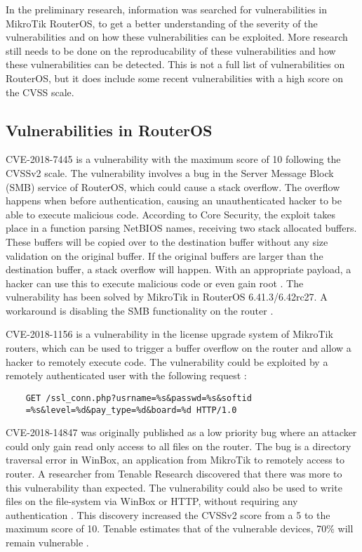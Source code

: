 In the preliminary research, information was searched for vulnerabilities in MikroTik RouterOS, to get a better understanding of the severity of the vulnerabilities and on how these vulnerabilities can be exploited. More research still needs to be done on the reproducability of these vulnerabilities and how these vulnerabilities can be detected. This is not a full list of vulnerabilities on RouterOS, but it does include some recent vulnerabilities with a high score on the CVSS scale.

\subsection{Vulnerabilities in RouterOS}
CVE-2018-7445 is a vulnerability with the maximum score of 10 following the CVSSv2 scale. The vulnerability involves a bug in the Server Message Block (SMB) service of RouterOS, which could cause a stack overflow. The overflow happens when before authentication, causing an unauthenticated hacker to be able to execute malicious code. According to Core Security, the exploit takes place in a function parsing NetBIOS names, receiving two stack allocated buffers. These buffers will be copied over to the destination buffer without any size validation on the original buffer. If the original buffers are larger than the destination buffer, a stack overflow will happen. With an appropriate payload, a hacker can use this to execute malicious code or even gain root \cite{CVE-2018-7445:CORESEC:2018}. The vulnerability has been solved by MikroTik in RouterOS 6.41.3/6.42rc27. A workaround is disabling the SMB functionality on the router \cite{CVE-2018-7445:CORESEC:2018}.

CVE-2018-1156 is a vulnerability in the license upgrade system of MikroTik routers, which can be used to trigger a buffer overflow on the router and allow a hacker to remotely execute code. The vulnerability could be exploited by a remotely authenticated user with the following request \cite{CVE2018-1156:Tenable:2018}:
\begin{verbatim}
    GET /ssl_conn.php?usrname=%s&passwd=%s&softid
    =%s&level=%d&pay_type=%d&board=%d HTTP/1.0
\end{verbatim}

CVE-2018-14847 was originally published as a low priority bug where an attacker could only gain read only access to all files on the router. The bug is a directory traversal error in WinBox, an application from MikroTik to remotely access to router. A researcher from Tenable Research discovered that there was more to this vulnerability than expected. The vulnerability could also be used to write files on the file-system via WinBox or HTTP, without requiring any authentication \cite{CVE-2018-14847:TENABLE:2018}. This discovery increased the CVSSv2 score from a 5 to the maximum score of 10. Tenable estimates that of the vulnerable devices, 70\% will remain vulnerable \cite{CVE-2018-14847:TENABLE:2018}.

